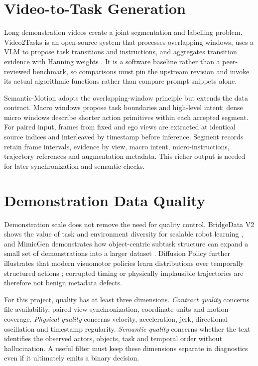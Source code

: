 \documentclass[11pt,oneside]{report}
\begin{document}
\section{Video-to-Task Generation}
Long demonstration videos create a joint segmentation and labelling problem.
Video2Tasks is an open-source system that processes overlapping windows, uses a
VLM to propose task transitions and instructions, and aggregates transition
evidence with Hanning weights \cite{video2tasks2025}. It is a software baseline
rather than a peer-reviewed benchmark, so comparisons must pin the upstream
revision and invoke its actual algorithmic functions rather than compare prompt
snippets alone.

Semantic-Motion adopts the overlapping-window principle but extends the data
contract. Macro windows propose task boundaries and high-level intent; dense
micro windows describe shorter action primitives within each accepted segment.
For paired input, frames from fixed and ego views are extracted at identical
source indices and interleaved by timestamp before inference. Segment records
retain frame intervals, evidence by view, macro intent, micro-instructions,
trajectory references and augmentation metadata. This richer output is needed
for later synchronization and semantic checks.

\section{Demonstration Data Quality}
Demonstration scale does not remove the need for quality control. BridgeData V2
shows the value of task and environment diversity for scalable robot learning
\cite{walke2023bridgedatav2}, and MimicGen demonstrates how object-centric
subtask structure can expand a small set of demonstrations into a larger
dataset \cite{mandlekar2023mimicgen}. Diffusion Policy further illustrates that
modern visuomotor policies learn distributions over temporally structured
actions \cite{chi2023diffusionpolicy}; corrupted timing or physically implausible
trajectories are therefore not benign metadata defects.

For this project, quality has at least three dimensions. \emph{Contract
quality} concerns file availability, paired-view synchronization, coordinate
units and motion coverage. \emph{Physical quality} concerns velocity,
acceleration, jerk, directional oscillation and timestamp regularity.
\emph{Semantic quality} concerns whether the text identifies the observed
actors, objects, task and temporal order without hallucination. A useful filter
must keep these dimensions separate in diagnostics even if it ultimately emits
a binary decision.
\end{document}
